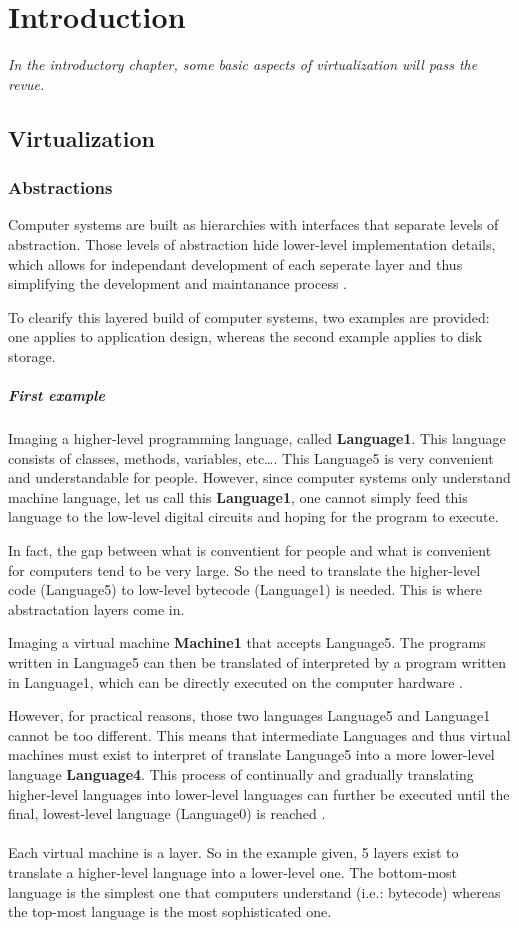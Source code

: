 \chapter{Introduction}
\label{chap:introduction}
\emph{In the introductory chapter, some basic aspects of virtualization will pass the revue.}
\section{Virtualization}

\subsection{Abstractions}

Computer systems are built as hierarchies with interfaces that separate levels of abstraction. Those levels of abstraction hide lower-level implementation details, which allows for independant development of each seperate layer and thus simplifying the development and maintanance process \citep{ArchVM}.

To clearify this layered build of computer systems, two examples are provided: one applies to application design, whereas the second example applies to disk storage.
\paragraph{First example} Imaging a higher-level programming language, called \textbf{Language1}. This language consists of classes, methods, variables, etc\ldots . This Language5 is very convenient and understandable for people. However, since computer systems only understand machine language, let us call this \textbf{Language1}, one cannot simply feed this language to the low-level digital circuits and hoping for the program to execute.

In fact, the gap between what is conventient for people and what is convenient for computers tend to be very large. So the need to translate the higher-level code (Language5) to low-level bytecode (Language1) is needed. This is where abstractation layers come in.

Imaging a virtual machine \textbf{Machine1} that accepts Language5. The programs written in Language5 can then be translated of interpreted by a program written in Language1, which can be directly executed on the computer hardware \citep{Tanenbaum}.

However, for practical reasons, those two languages Language5 and Language1 cannot be too different. This means that intermediate Languages and thus virtual machines must exist to interpret of translate Language5 into a more lower-level language \textbf{Language4}. This process of continually and gradually translating higher-level languages into lower-level languages can further be executed until the final, lowest-level language (Language0) is reached  \citep{Tanenbaum}. \\ \\
Each virtual machine is a layer. So in the example given, 5 layers exist to translate a higher-level language into a lower-level one. The bottom-most language is the simplest one that computers understand (i.e.: bytecode) whereas the top-most language is the most sophisticated one.

